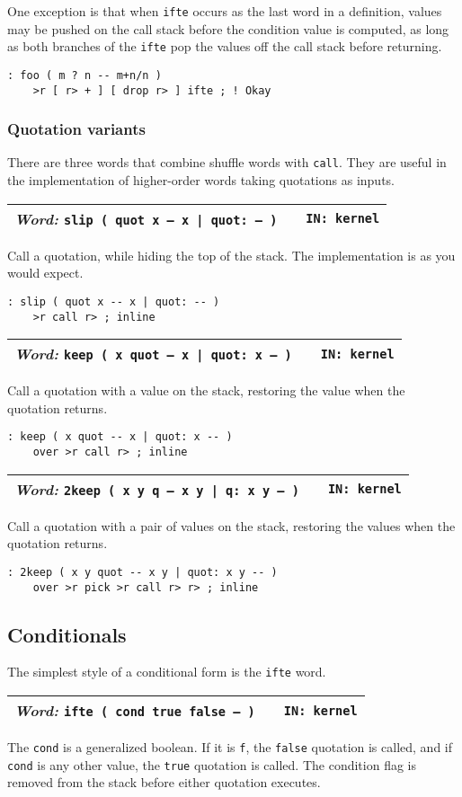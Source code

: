 \documentclass{report}
\newcommand{\ordinaryword}[3]{\index{#1}
\emph{Word:} \texttt{#2} &&\texttt{IN: #3}}
\newcommand{\wordtable}[1]{

\begin{tabularx}{12cm}[t]{lXr}
\hline
#1\\
\hline
\end{tabularx}

}
\begin{document}
One exception is that when \texttt{ifte} occurs as the last word in a definition, values may be pushed on the call stack before the condition value is computed, as long as both branches of the \texttt{ifte} pop the values off the call stack before returning.
\begin{verbatim}
: foo ( m ? n -- m+n/n )
    >r [ r> + ] [ drop r> ] ifte ; ! Okay
\end{verbatim}

\subsubsection{Quotation variants}

There are three words that combine shuffle words with \texttt{call}. They are useful in the implementation of higher-order words taking quotations as inputs.
\wordtable{
\ordinaryword{slip}{slip ( quot x -- x | quot: -- )}{kernel}
}
Call a quotation, while hiding the top of the stack. The implementation is as you would expect.
\begin{verbatim}
: slip ( quot x -- x | quot: -- )
    >r call r> ; inline
\end{verbatim}
\wordtable{
\ordinaryword{keep}{keep ( x quot -- x | quot:~x -- )}{kernel}
}
Call a quotation with a value on the stack, restoring the value when the quotation returns.
\begin{verbatim}
: keep ( x quot -- x | quot: x -- )
    over >r call r> ; inline
\end{verbatim}
\wordtable{
\ordinaryword{2keep}{2keep ( x y q -- x y | q:~x y -- )}{kernel}
}
Call a quotation with a pair of values on the stack, restoring the values when the quotation returns.
\begin{verbatim}
: 2keep ( x y quot -- x y | quot: x y -- )
    over >r pick >r call r> r> ; inline
\end{verbatim}

\subsection{Conditionals}

The simplest style of a conditional form is the \texttt{ifte} word.
\wordtable{
\ordinaryword{ifte}{ifte ( cond true false -- )}{kernel}
}
The \texttt{cond} is a generalized boolean. If it is \texttt{f}, the \texttt{false} quotation is called, and if \texttt{cond} is any other value, the \texttt{true} quotation is called. The condition flag is removed from the stack before either quotation executes.
\end{document}
